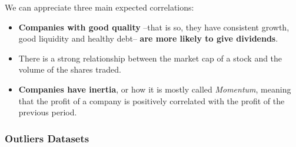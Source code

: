 \documentclass[11pt,english,a4paper,hidelinks]{book}
\begin{document}
\noindent We can appreciate three main expected correlations:
\begin{itemize}
    \item \textbf{Companies with good quality} --that is so, they have consistent growth, good liquidity and healthy debt-- \textbf{are more likely to give dividends}.
    \item There is a strong relationship between the market cap of a stock and the volume of the shares traded.
    \item \textbf{Companies have inertia}, or how it is mostly called \textit{Momentum}, meaning that the profit of a company is positively correlated with the profit of the previous period.
\end{itemize}

\subsubsection{Outliers Datasets}
\end{document}
